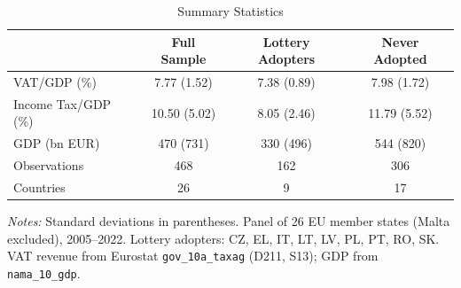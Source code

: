 \begin{table}[t]
\centering
\caption{Summary Statistics}
\label{tab:summary}
\begin{tabular}{lccc}
\toprule
 & Full Sample & Lottery Adopters & Never Adopted \\
\midrule
VAT/GDP (\%) & 7.77 (1.52) & 7.38 (0.89) & 7.98 (1.72) \\
Income Tax/GDP (\%) & 10.50 (5.02) & 8.05 (2.46) & 11.79 (5.52) \\
GDP (bn EUR) & 470 (731) & 330 (496) & 544 (820) \\
Observations & 468 & 162 & 306 \\
Countries & 26 & 9 & 17 \\
\bottomrule
\end{tabular}
\begin{tablenotes}
\small
\item \textit{Notes:} Standard deviations in parentheses. Panel of 26 EU member states (Malta excluded), 2005--2022. Lottery adopters: CZ, EL, IT, LT, LV, PL, PT, RO, SK. VAT revenue from Eurostat \texttt{gov\_10a\_taxag} (D211, S13); GDP from \texttt{nama\_10\_gdp}.
\end{tablenotes}
\end{table}
